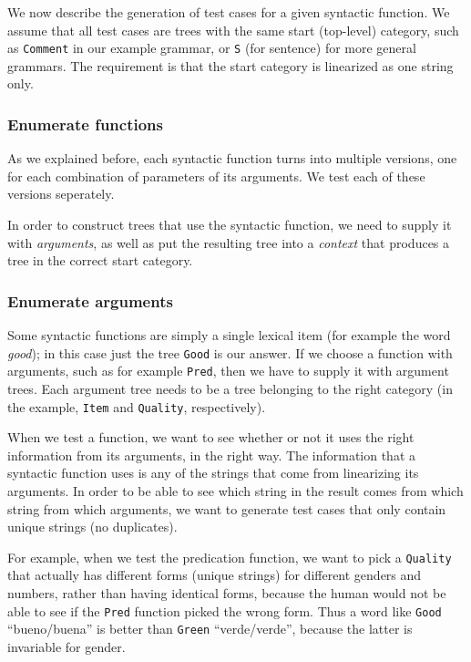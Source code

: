 \documentclass[runningheads]{llncs}
\def\t#1{\texttt{#1}}
\begin{document}
We now describe the generation of test cases for a given syntactic
function. We assume that all test cases are trees with the same start
(top-level) category, such as \t{Comment} in our example grammar, or \t{S}
(for sentence) for more general grammars. The requirement is that the
start category is linearized as one string only. 

\subsubsection{Enumerate functions} As we explained before, each syntactic
function turns into multiple versions, one for each combination of
parameters of its arguments. We test each of these versions
seperately. 

In order to construct trees that use the syntactic function, we need
to supply it with \emph{arguments}, as well as put the resulting tree
into a \emph{context} that produces a tree in the correct start
category.

\subsubsection{Enumerate arguments} Some syntactic functions are simply a single lexical item (for example the word \emph{good}); in this case just the tree \t{Good} is our answer. If we choose a function with arguments, such as for example \t{Pred}, then we have to supply it with argument trees. Each argument tree needs to be a tree belonging to the right category (in the example, \t{Item} and \t{Quality}, respectively).

When we test a function, we want to see whether or not it uses the right information from its arguments, in the right way. The information that a syntactic function uses is any of the strings that come from linearizing its arguments. In order to be able to see which string in the result comes from which string from which arguments, we want to generate test cases that only contain unique strings (no duplicates).

For example, when we test the predication function, we want to pick a
\t{Quality} that actually has different forms (unique strings) for 
different genders and numbers, rather than having identical forms,
because the human would not be able to see if the \t{Pred} function
picked the wrong form. Thus a word like \t{Good} ``bueno/buena'' is
better than \t{Green} ``verde/verde'', because the latter is
invariable for gender.
\end{document}
